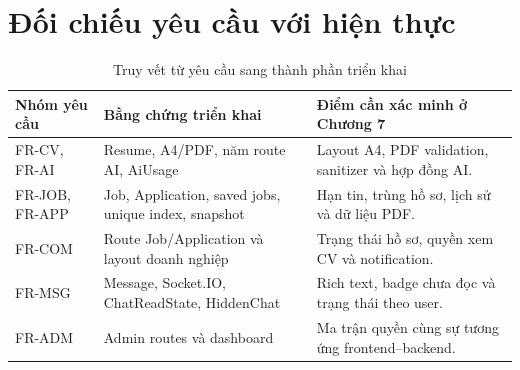 \section{Đối chiếu yêu cầu với hiện thực}

\begin{table}[H]
    \centering
    \small
    \begin{tabularx}{\textwidth}{|p{}|p{}|Y|} \hline
        \textbf{Nhóm yêu cầu} & \textbf{Bằng chứng triển khai} & \textbf{Điểm cần xác minh ở Chương 7} \\ \hline
        FR-CV, FR-AI & Resume, A4/PDF, năm route AI, AiUsage & Layout A4, PDF validation, sanitizer và hợp đồng AI. \\ \hline
        FR-JOB, FR-APP & Job, Application, saved jobs, unique index, snapshot & Hạn tin, trùng hồ sơ, lịch sử và dữ liệu PDF. \\ \hline
        FR-COM & Route Job/Application và layout doanh nghiệp & Trạng thái hồ sơ, quyền xem CV và notification. \\ \hline
        FR-MSG & Message, Socket.IO, ChatReadState, HiddenChat & Rich text, badge chưa đọc và trạng thái theo user. \\ \hline
        FR-ADM & Admin routes và dashboard & Ma trận quyền cùng sự tương ứng frontend--backend. \\ \hline
    \end{tabularx}
    \caption{Truy vết từ yêu cầu sang thành phần triển khai}
    \label{tab:implementation-traceability}
\end{table}
